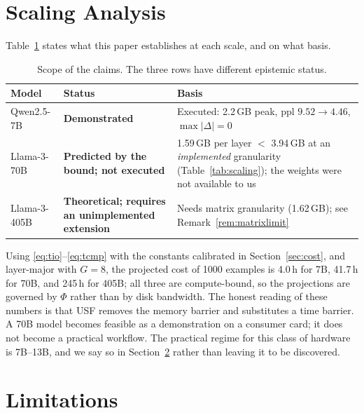 \documentclass[preprint,12pt]{elsarticle}
\newcommand{\usf}{USF}
\begin{document}
\section{Scaling Analysis}
\label{sec:scaling}

Table~\ref{tab:claims} states what this paper establishes at each scale, and on what basis.

\begin{table}[t]
\centering
\caption{Scope of the claims. The three rows have different epistemic status.}
\label{tab:claims}
\footnotesize
\begin{tabular}{@{}p{1.55cm}p{2.1cm}p{3.8cm}@{}}
\toprule
\textbf{Model} & \textbf{Status} & \textbf{Basis} \\
\midrule
Qwen2.5-7B &
\textbf{Demonstrated} &
Executed: 2.2\,GB peak, ppl $9.52\!\to\!4.46$, $\max|\Delta|=0$ \\[2pt]
Llama-3-70B &
\textbf{Predicted by the bound; not executed} &
1.59\,GB per layer $<$ 3.94\,GB at an \emph{implemented} granularity
(Table~\ref{tab:scaling}); the weights were not available to us \\[2pt]
Llama-3-405B &
\textbf{Theoretical; requires an unimplemented extension} &
Needs matrix granularity (1.62\,GB); see Remark~\ref{rem:matrixlimit} \\
\bottomrule
\end{tabular}
\end{table}

Using \eqref{eq:tio}--\eqref{eq:tcmp} with the constants calibrated in Section~\ref{sec:cost}, and
layer-major with $G=8$, the projected cost of 1000 examples is 4.0\,h for 7B, 41.7\,h for 70B, and
245\,h for 405B; all three are compute-bound, so the projections are governed by $\Phi$ rather than
by disk bandwidth. The honest reading of these numbers is that \usf{} removes the memory barrier
and substitutes a time barrier. A 70B model becomes feasible as a demonstration on a
consumer card; it does not become a practical workflow. The practical regime for this class of
hardware is 7B--13B, and we say so in Section~\ref{sec:limits} rather than leaving it to be discovered.

\section{Limitations}
\label{sec:limits}
\end{document}

